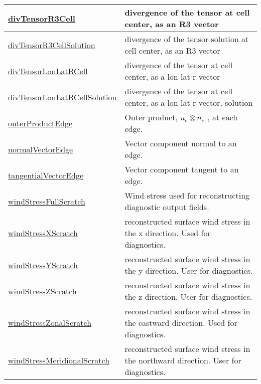 {\begin{center}
\begin{longtable}{| p{2.0in} | p{4.0in} |}
    \hline
    \hyperref[subsec:var_sec_scratch_divTensorR3Cell]{divTensorR3Cell} & divergence of the tensor at cell center, as an R3 vector \\
    \hline
    \hyperref[subsec:var_sec_scratch_divTensorR3CellSolution]{divTensorR3CellSolution} & divergence of the tensor solution at cell center, as an R3 vector \\
    \hline
    \hyperref[subsec:var_sec_scratch_divTensorLonLatRCell]{divTensorLonLatRCell} & divergence of the tensor at cell center, as a lon-lat-r vector \\
    \hline
    \hyperref[subsec:var_sec_scratch_divTensorLonLatRCellSolution]{divTensorLonLatRCellSolution} & divergence of the tensor at cell center, as a lon-lat-r vector, solution \\
    \hline
    \hyperref[subsec:var_sec_scratch_outerProductEdge]{outerProductEdge} &  Outer product,  $u_e \otimes n_e$ , at each edge. \\
    \hline
    \hyperref[subsec:var_sec_scratch_normalVectorEdge]{normalVectorEdge} & Vector component normal to an edge. \\
    \hline
    \hyperref[subsec:var_sec_scratch_tangentialVectorEdge]{tangentialVectorEdge} & Vector component tangent to an edge. \\
    \hline
    \hyperref[subsec:var_sec_scratch_windStressFullScratch]{windStressFullScratch} & Wind stress used for reconstructing diagnostic output fields. \\
    \hline
    \hyperref[subsec:var_sec_scratch_windStressXScratch]{windStressXScratch} & reconstructed surface wind stress in the x direction. Used for diagnostics. \\
    \hline
    \hyperref[subsec:var_sec_scratch_windStressYScratch]{windStressYScratch} & reconstructed surface wind stress in the y direction. User for diagnostics. \\
    \hline
    \hyperref[subsec:var_sec_scratch_windStressZScratch]{windStressZScratch} & reconstructed surface wind stress in the z direction. User for diagnostics. \\
    \hline
    \hyperref[subsec:var_sec_scratch_windStressZonalScratch]{windStressZonalScratch} & reconstructed surface wind stress in the eastward direction. Used for diagnostics. \\
    \hline
    \hyperref[subsec:var_sec_scratch_windStressMeridionalScratch]{windStressMeridionalScratch} & reconstructed surface wind stress in the northward direction. User for diagnostics. \\

\end{longtable}
\end{center}}
